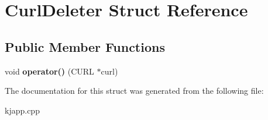 \hypertarget{structCurlDeleter}{}\section{Curl\+Deleter Struct Reference}
\label{structCurlDeleter}
\subsection*{Public Member Functions}
\begin{DoxyCompactItemize}
\item 
void {\bfseries operator()} (C\+U\+RL $\ast$curl)\hypertarget{structCurlDeleter_a772352646fa57a03c2275397326e82b8}{}\label{structCurlDeleter_a772352646fa57a03c2275397326e82b8}

\end{DoxyCompactItemize}


The documentation for this struct was generated from the following file\+:\begin{DoxyCompactItemize}
\item 
kjapp.\+cpp\end{DoxyCompactItemize}
